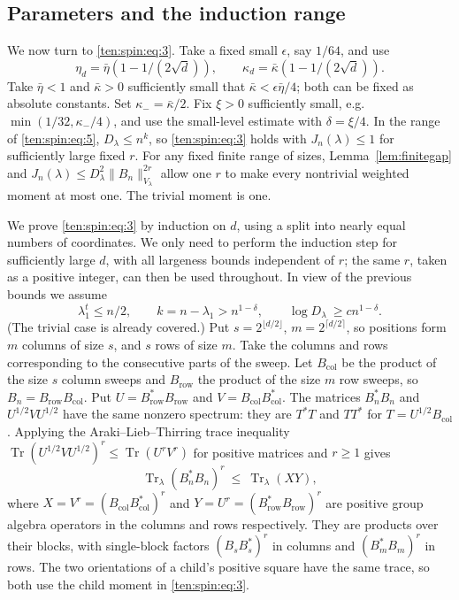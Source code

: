 \subsection{Parameters and the induction range}
We now turn to \eqref{ten:spin:eq:3}. Take a fixed small \(\epsilon\), say \(1/64\), and use
\[
 \eta_d=\bar\eta(1-1/(2\sqrt d)),\qquad
 \kappa_d=\bar\kappa(1-1/(2\sqrt d)).
\]
Take \(\bar\eta<1\) and \(\bar\kappa>0\) sufficiently small that \(\bar\kappa<\epsilon\bar\eta/4\); both can be fixed as absolute constants. Set \(\kappa_-=\bar\kappa/2\). Fix \(\xi>0\) sufficiently small, e.g. \(\min(1/32,\kappa_-/4)\), and use the small-level estimate with \(\delta=\xi/4\). In the range of \eqref{ten:spin:eq:5}, \(D_\lambda\le n^k\), so \eqref{ten:spin:eq:3} holds with \(J_n(\lambda)\le 1\) for sufficiently large fixed \(r\). For any fixed finite range of sizes, Lemma~\ref{lem:finitegap} and
\(J_n(\lambda)\le D_\lambda^2\|B_n\|_{V_\lambda}^{2r}\)
allow one \(r\) to make every nontrivial weighted moment at most one. The trivial moment is one.

We prove \eqref{ten:spin:eq:3} by induction on \(d\), using a split into nearly equal numbers of coordinates. We only need to perform the induction step for sufficiently large \(d\), with all largeness bounds independent of \(r\); the same \(r\), taken as a positive integer, can then be used throughout. In view of the previous bounds we assume
\begin{equation}
 \lambda_1^t\le n/2,\qquad k=n-\lambda_1>n^{1-\delta},
 \qquad \log D_\lambda\ \ge c n^{1-\delta}.
 \label{ten:spin:eq:6}
\end{equation}
(The trivial case is already covered.) Put \(s=2^{\lfloor d/2\rfloor}\), \(m=2^{\lceil d/2\rceil}\), so positions form \(m\) columns of size \(s\), and \(s\) rows of size \(m\). Take the columns and rows corresponding to the consecutive parts of the sweep. Let \(B_{\mathrm{col}}\) be the product of the size \(s\) column sweeps and \(B_{\mathrm{row}}\) the product of the size \(m\) row sweeps, so
\(B_n=B_{\mathrm{row}}B_{\mathrm{col}}\).
Put \(U=B_{\mathrm{row}}^*B_{\mathrm{row}}\) and
\(V=B_{\mathrm{col}}B_{\mathrm{col}}^*\). The matrices \(B_n^*B_n\) and
\(U^{1/2}VU^{1/2}\) have the same nonzero spectrum: they are \(T^*T\) and \(TT^*\) for \(T=U^{1/2}B_{\mathrm{col}}\). Applying the Araki--Lieb--Thirring trace inequality
\(\operatorname{Tr}(U^{1/2} V U^{1/2})^r\le\operatorname{Tr}(U^r V^r)\) for positive matrices and \(r\ge1\) gives
\begin{equation}
 \operatorname{Tr}_\lambda (B_n^* B_n)^r
 \ \le\ \operatorname{Tr}_\lambda(XY),
 \label{ten:spin:eq:7}
\end{equation}
where \(X=V^r=(B_{\mathrm{col}}B_{\mathrm{col}}^*)^r\) and
\(Y=U^r=(B_{\mathrm{row}}^*B_{\mathrm{row}})^r\) are positive group algebra operators in the columns and rows respectively. They are products over their blocks, with single-block factors \((B_sB_s^*)^r\) in columns and \((B_m^*B_m)^r\) in rows. The two orientations of a child's positive square have the same trace, so both use the child moment in \eqref{ten:spin:eq:3}.

